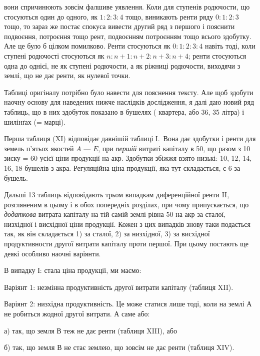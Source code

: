 \parcont{}  %
вони спричинюють зовсім фалшиве уявлення. Коли для ступенів родючости, що
стосуються один до одного, як $1: 2 : 3 : 4$ тощо, виникають ренти ряду $0 : 1 : 2 : 3$
тощо, то зараз же постає спокуса вивести другий ряд з першого і пояснити
подвоєння, потроєння тощо рент, подвоєнням потроєнням тощо всього здобутку.
Але це було б цілком помилково. Ренти стосуються як $0 : 1 : 2 : 3 : 4$ навіть
тоді, коли ступені родючості стосуються як $n : n + 1 : n + 2 : n + 3 : n + 4$;
ренти стосуються одна до однієї, не як ступені родючости, а як ріжниці родючости,
виходячи з землі, що не дає ренти, як нулевої точки.

Таблиці оригіналу потрібно було навести для пояснення тексту. Але щоб
здобути наочну основу для наведених нижче наслідків дослідження, я далі
даю новий ряд таблиць, що в них здобуток показано в бушелях (  квартера,
або 36, 35 літра) і шилінґах (= марці).

Перша таблиця (XI) відповідає давнішій таблиці І.~Вона дає здобутки
і ренти для земель п’ятьох якостей $A$ — $E$, при \emph{першій} витраті капіталу в 50, що разом з 10 зиску = 60 усієї ціни продукції на акр. Здобутки
збіжжя взято низькі: 10, 12, 14, 16, 18 бушелів з акра. Регуляційна
ціна продукції, яка тут складається, є 6 за бушель.

Дальші 13 таблиць відповідають трьом випадкам диференційної ренти II,
розгляненим в цьому і в обох попередніх розділах, при чому припускається, що
\emph{додаткова} витрата капіталу на тій самій землі рівна 50 на акр за сталої,
низхідної і висхідної ціни продукції. Кожен з цих випадків знову таки
подається так, як він складається 1) за сталої, 2) за низхідної, 3) за висхідної
продуктивности другої витрати капіталу проти першої. При цьому постають ще
деякі особливо наочні варіянти.

В випадку І: стала ціна продукції, ми маємо:

Варіянт 1: незмінна продуктивність другої витрати капіталу (таблиця XII).

Варіянт 2: низхідна продуктивність. Це може статися лише тоді, коли на землі
А не робиться жодної другої витрати. А саме або:

а) так, що земля $В$ теж не дає ренти (таблиця XIII), або

б) так, що земля $В$ не стає землею, що зовсім не дає ренти (таблиця XIV).

